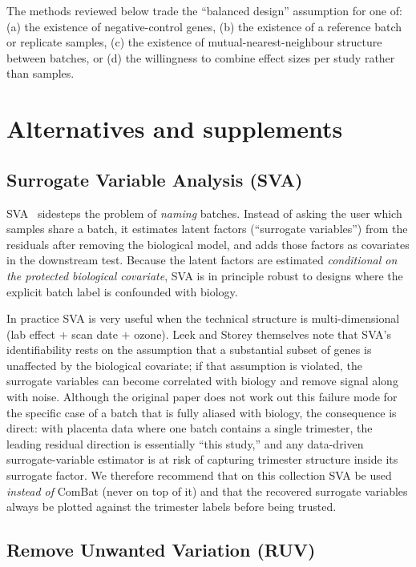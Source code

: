 \documentclass[11pt,a4paper]{article}
\begin{document}
The methods reviewed below trade the ``balanced design'' assumption
for one of: (a) the existence of negative-control genes, (b) the
existence of a reference batch or replicate samples, (c) the
existence of mutual-nearest-neighbour structure between batches, or
(d) the willingness to combine effect sizes per study rather than
samples.

\section{Alternatives and supplements}

\subsection{Surrogate Variable Analysis (SVA)}

SVA~\cite{leek2007} sidesteps the problem of \emph{naming} batches.
Instead of asking the user which samples share a batch, it estimates
latent factors (``surrogate variables'') from the residuals after
removing the biological model, and adds those factors as covariates
in the downstream test. Because the latent factors are estimated
\emph{conditional on the protected biological covariate}, SVA is in
principle robust to designs where the explicit batch label is
confounded with biology.

In practice SVA is very useful when the technical structure is
multi-dimensional (lab effect $+$ scan date $+$ ozone). Leek and
Storey themselves note that SVA's identifiability rests on the
assumption that a substantial subset of genes is unaffected by the
biological covariate; if that assumption is violated, the surrogate
variables can become correlated with biology and remove signal
along with noise. Although the original paper does not work out
this failure mode for the specific case of a batch that is fully
aliased with biology, the consequence is direct: with placenta
data where one batch contains a single trimester, the leading
residual direction is essentially ``this study,'' and any
data-driven surrogate-variable estimator is at risk of capturing
trimester structure inside its surrogate factor. We therefore
recommend that on this collection SVA be used \emph{instead of}
ComBat (never on top of it) and that the recovered surrogate
variables always be plotted against the trimester labels before
being trusted.

\subsection{Remove Unwanted Variation (RUV)}
\end{document}
